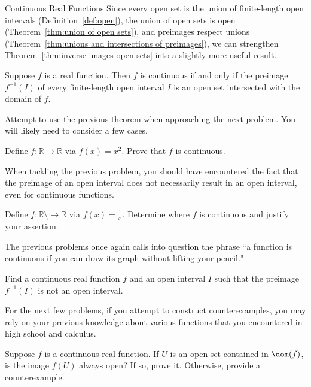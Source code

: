 \begin{section}{Continuous Real Functions}
Since every open set is the union of finite-length open intervals (Definition~\ref{def:open}), the union of open sets is open (Theorem~\ref{thm:union of open sets}), and preimages respect unions (Theorem~\ref{thm:unions and intersections of preimages}), we can strengthen Theorem~\ref{thm:inverse images open sets} into a slightly more useful result.  

\begin{theorem}\label{thm:inverse images basic open sets}
Suppose $f$ is a real function. Then $f$ is continuous if and only if the preimage $f^{-1}(I)$ of every finite-length open interval $I$ is an open set intersected with the domain of $f$.
\end{theorem}

Attempt to use the previous theorem when approaching the next problem.  You will likely need to consider a few cases. 

\begin{problem}
Define $f:\mathbb{R}\to\mathbb{R}$ via $f(x)=x^2$. Prove that $f$ is continuous.
\end{problem}

When tackling the previous problem, you should have encountered the fact that the preimage of an open interval does not necessarily result in an open interval, even for continuous functions.

\begin{problem}
Define $f:\mathbb{R}\setminus\to\mathbb{R}$ via $f(x)=\frac{1}{x}$. Determine where $f$ is continuous and justify your assertion.
\end{problem}

The previous problems once again calls into question the phrase ``a function is continuous if you can draw its graph without lifting your pencil."

\begin{problem}
Find a continuous real function $f$ and an open interval $I$ such that the preimage $f^{-1}(I)$ is not an open interval.
\end{problem}

For the next few problems, if you attempt to construct counterexamples, you may rely on your previous knowledge about various functions that you encountered in high school and calculus.

\begin{problem}
Suppose $f$ is a continuous real function. If $U$ is an open set contained in $\dom(f)$, is the image $f(U)$ always open?  If so, prove it.  Otherwise, provide a counterexample.
\end{problem}


\end{section}
